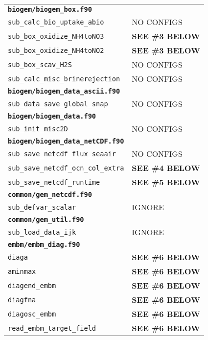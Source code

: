 \documentclass[a4paper,10pt,article]{memoir}
\begin{document}
\begin{tabular}{ll}
  \multicolumn{2}{l}{\textbf{\texttt{biogem/biogem\_box.f90}}} \\
  \texttt{sub\_calc\_bio\_uptake\_abio}    & NO CONFIGS \\
  \texttt{sub\_box\_oxidize\_NH4toNO3}     & \textbf{SEE \#3 BELOW} \\
  \texttt{sub\_box\_oxidize\_NH4toNO2}     & \textbf{SEE \#3 BELOW} \\
  \texttt{sub\_box\_scav\_H2S}             & NO CONFIGS \\
  \texttt{sub\_calc\_misc\_brinerejection} & NO CONFIGS \\

  \multicolumn{2}{l}{\textbf{\texttt{biogem/biogem\_data\_ascii.f90}}} \\
  \texttt{sub\_data\_save\_global\_snap} & NO CONFIGS \\

  \multicolumn{2}{l}{\textbf{\texttt{biogem/biogem\_data.f90}}} \\
  \texttt{sub\_init\_misc2D} & NO CONFIGS \\

  \multicolumn{2}{l}{\textbf{\texttt{biogem/biogem\_data\_netCDF.f90}}} \\
  \texttt{sub\_save\_netcdf\_flux\_seaair}    & NO CONFIGS \\
  \texttt{sub\_save\_netcdf\_ocn\_col\_extra} & \textbf{SEE \#4 BELOW} \\
  \texttt{sub\_save\_netcdf\_runtime}         & \textbf{SEE \#5 BELOW} \\

  \multicolumn{2}{l}{\textbf{\texttt{common/gem\_netcdf.f90}}} \\
  \texttt{sub\_defvar\_scalar} & IGNORE \\

  \multicolumn{2}{l}{\textbf{\texttt{common/gem\_util.f90}}} \\
  \texttt{sub\_load\_data\_ijk} & IGNORE \\

  \multicolumn{2}{l}{\textbf{\texttt{embm/embm\_diag.f90}}} \\
  \texttt{diaga}                     & \textbf{SEE \#6 BELOW} \\
  \texttt{aminmax}                   & \textbf{SEE \#6 BELOW} \\
  \texttt{diagend\_embm}             & \textbf{SEE \#6 BELOW} \\
  \texttt{diagfna}                   & \textbf{SEE \#6 BELOW} \\
  \texttt{diagosc\_embm}             & \textbf{SEE \#6 BELOW} \\
  \texttt{read\_embm\_target\_field} & \textbf{SEE \#6 BELOW} \\


\end{tabular}
\end{document}
